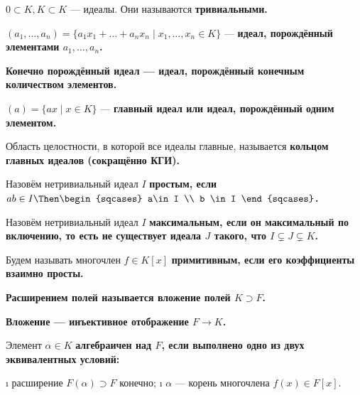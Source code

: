 \begin{defn}
\(0 \subset K, K \subset K\) --- идеалы. Они называются \bf{тривиальными}.
\end{defn}

\begin{defn}
\((a_1,\ldots,a_n) = \{a_1x_1+\ldots+a_nx_n \mid x_1,\ldots,x_n \in K\}\) --- \bf{идеал, порождённый элементами \(a_1,\ldots,a_n\)}.
\end{defn}

\begin{defn}
\bf{Конечно порождённый идеал} --- идеал, порождённый конечным количеством элементов.
\end{defn}

\begin{defn}
\((a) = \{ax \mid x\in K\}\) --- \bf{главный идеал} или \bf{идеал, порождённый одним элементом}.
\end{defn}

\begin{defn}
Область целостности, в которой все идеалы главные, называется \bf{кольцом главных идеалов} (сокращённо КГИ).
\end{defn}

\begin{defn}
Назовём нетривиальный идеал \(I\) \bf{простым}, если \(ab \in I \Then \begin{sqcases} a\in I \\ b \in I \end{sqcases}\).
\end{defn}

\begin{defn}
Назовём нетривиальный идеал \(I\) \bf{максимальным}, если он максимальный по включению, то есть не существует идеала \(J\) такого, что \(I \subsetneq J \subsetneq K\).
\end{defn}

\begin{defn}
Будем называть многочлен \(f \in K[x]\) \bf{примитивным}, если его коэффициенты взаимно просты.
\end{defn}

\begin{defn}
\bf{Расширением полей} называется вложение полей \(K \supset F\).

\bf{Вложение} --- инъективное отображение \(F \to K\).
\end{defn}

\begin{defn}
Элемент \(\alpha \in K\) \bf{алгебраичен} над \(F\), если выполнено одно из двух эквивалентных условий:

\begin{enumerate}
\def\labelenumi{\arabic{enumi}.}
\tightlist
\i
  расширение \(F(\alpha) \supset F\) конечно;
\i
  \(\alpha\) --- корень многочлена \(f(x) \in F[x]\).
\end{enumerate}

\end{defn}

